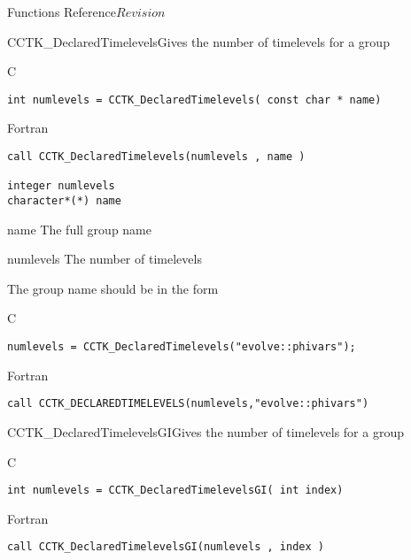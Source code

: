 \begin{cactuspart}{ Functions Reference}{}{$Revision$}


\begin{FunctionDescription}{CCTK\_DeclaredTimelevels}{Gives the number of timelevels for a group}
\label{CCTK-DeclaredTimelevels}
\begin{SynopsisSection}
\begin{Synopsis}{C}
\begin{verbatim}int numlevels = CCTK_DeclaredTimelevels( const char * name)\end{verbatim}
\end{Synopsis}
\begin{Synopsis}{Fortran}
\begin{verbatim}call CCTK_DeclaredTimelevels(numlevels , name )

integer numlevels
character*(*) name\end{verbatim}
\end{Synopsis}
\end{SynopsisSection}
\begin{ParameterSection}
\begin{Parameter}{name}
The full group name
\end{Parameter}
\begin{Parameter}{numlevels}
The number of timelevels
\end{Parameter}
\end{ParameterSection}
\begin{Discussion}
The group name should be in the form 
\end{Discussion}
\begin{ExampleSection}
\begin{Example}{C}
\begin{verbatim}
numlevels = CCTK_DeclaredTimelevels("evolve::phivars");
\end{verbatim}
\end{Example}
\begin{Example}{Fortran}
\begin{verbatim}
call CCTK_DECLAREDTIMELEVELS(numlevels,"evolve::phivars")
\end{verbatim}
\end{Example}
\end{ExampleSection}
\end{FunctionDescription}

\begin{FunctionDescription}{CCTK\_DeclaredTimelevelsGI}{Gives the number of timelevels for a group}
\label{CCTK-DeclaredTimelevelsGI}
\begin{SynopsisSection}
\begin{Synopsis}{C}
\begin{verbatim}int numlevels = CCTK_DeclaredTimelevelsGI( int index)\end{verbatim}
\end{Synopsis}
\begin{Synopsis}{Fortran}
\begin{verbatim}call CCTK_DeclaredTimelevelsGI(numlevels , index )


\end{verbatim}
\end{Synopsis}
\end{SynopsisSection}
\end{FunctionDescription}
\end{cactuspart}
